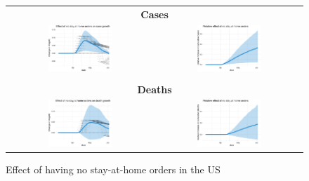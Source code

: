 \documentclass[11pt,reqno,letter]{amsart}
\theoremstyle{definition}
\begin{document}
\begin{figure}[ht]
  \caption{Effect of having no stay-at-home orders in the US\label{fig:US-shelter}}
  \begin{minipage}{\linewidth}
    \centering
    \begin{tabular}{cc}
      \multicolumn{2}{c}{\textbf{Cases}} \\
      \includegraphics[width=0.45\textwidth]{tables_and_figures/us-shelter-dgrowth_idx}
      &
        \includegraphics[width=0.45\textwidth]{tables_and_figures/us-shelter-rcumu_idx}
      \\
      \\
      \multicolumn{2}{c}{\textbf{Deaths}} \\
      \includegraphics[width=0.45\textwidth]{tables_and_figures/us-shelter-dgrowth_deaths_idx}
      &
        \includegraphics[width=0.45\textwidth]{tables_and_figures/us-shelter-rcumu_deaths_idx}
    \end{tabular}


\end{minipage}
\end{figure}
\end{document}
